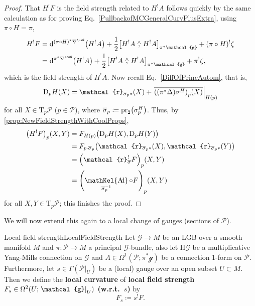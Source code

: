 \documentclass[reqno,a4paper,oneside]{amsart}
\theoremstyle{plain}
\theoremstyle{remark}
\theoremstyle{definition}
\DeclareMathOperator{\sAd}{\mathKel{A\mkern-5.5mu d}}
\begin{document}
\begin{proof}
\leavevmode\newline
That $H^!F$ is the field strength related to $H^!A$ follows quickly by the same calculation as for proving Eq.\ \eqref{PullbackofMCGeneralCurvPlusExtra}, using $\pi \circ H = \pi$,
\begin{align*}
H^!F
&=
\mathrm{d}^{(\pi \circ H)^*\nabla^\caG} \mleft(H^!A\mright)
	+ \frac{1}{2} \mleft[ H^!A \stackrel{\wedge}{,} H^!A \mright]_{\pi^*\mathcal{g}}
	+ (\pi \circ H)^!\zeta
\\
&=
\mathrm{d}^{\pi^*\nabla^\caG} \mleft(H^!A\mright)
	+ \frac{1}{2} \mleft[ H^!A \stackrel{\wedge}{,} H^!A \mright]_{\pi^*\mathcal{g}}
	+ \pi^!\zeta,
\end{align*}
which is the field strength of $H^!A$. Now recall Eq.\ \eqref{DiffOfPrincAutom}, that is,
\begin{equation*}
\mathrm{D}_p H(X)
=
\mathcal{r}_{\overline{\sigma}_p*}(X)
	+ \mleft.{\overline{ \mleft(\mleft(\pi^*\Delta\mright)\sigma^H\mright)_p(X) }}\mright|_{H(p)}
\end{equation*}
for all $X \in \mathrm{T}_p\mathcal{P}$ ($p \in \mathcal{P}$), where $\overline{\sigma}_p \coloneqq \mathrm{pr}_2\mleft( \sigma^H_p \mright)$. Thus, by \ref{prop:NewFieldStrengthWithCoolProps},
\begin{align*}
\mleft( H^!F \mright)_p(X, Y)
&=
F_{H(p)}\bigl( \mathrm{D}_pH(X), \mathrm{D}_pH(Y) \bigr)
\\
&=
F_{p \cdot \overline{\sigma}_p}\bigl( \mathcal{r}_{\overline{\sigma}_p*}(X), \mathcal{r}_{\overline{\sigma}_p*}(Y) \bigr)
\\
&=
\mleft(\mathcal{r}_{\overline{\sigma}}^!F\mright)_p(X, Y)
\\
&=
\mleft(\sAd_{\overline{\sigma}_p^{-1}} \circ F\mright)_p(X, Y)
\end{align*}
for all $X, Y \in \mathrm{T}_p \mathcal{P}$; this finishes the proof.
\end{proof}

We will now extend this again to a local change of gauges (sections of $\mathcal{P}$).

\begin{definitions}{Local field strength}{LocalFieldStrength}
Let $\mathcal{G} \to M$ be an LGB over a smooth manifold $M$ and $\pi\colon\mathcal{P} \to M$ a principal $\mathcal{G}$-bundle, also let $\mathrm{H}\mathcal{G}$ be a multiplicative Yang-Mills connection on $\mathcal{G}$ and $A \in \Omega^1(\mathcal{P}; \pi^*\mathcal{g})$ be a connection 1-form on $\mathcal{P}$. Furthermore, let $s \in \Gamma(\mathcal{P}|_U)$ be a (local) gauge over an open subset $U \subset M$. Then we define the \textbf{local curvature} of \textbf{local field strength $F_s \in \Omega^2\mleft(U; \mleft.\mathcal{g}\mright|_U\mright)$ (w.r.t.\ $s$)} by
\begin{equation*}
F_s
\coloneqq
s^!F.
\end{equation*}
\end{definitions}
\end{document}
